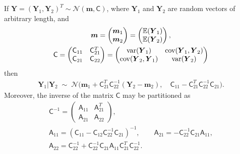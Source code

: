 \documentclass{svjour3}                     %
\newcommand{\bm}[1]{\boldsymbol{#1}}
\newcommand{\Ex}{\mathbb{E}}
\newcommand{\vm}{\bm{m}}
\newcommand{\vY}{\bm{Y}}
\newcommand{\mA}{\mathsf{A}}
\newcommand{\mC}{\mathsf{C}}
\newcommand{\cov}{{\textup{cov}}}
\newcommand{\var}{{\textup{var}}}
\newcommand{\calN}{\mathcal{N}}
\begin{document}
\begin{lemma} \cite[(A.6), (A.11--13)]{RasWil06a} \label{thrm:condDist} If $\vY = (\vY_1, \vY_2)^T \sim \calN (\vm,\mC)$, where $\vY_1$ and $\vY_2$ are random vectors of arbitrary length, and 
	\begin{gather*}
	\vm = \begin{pmatrix} \vm_1 \\ \vm_2 \end{pmatrix} = \begin{pmatrix} \Ex(\vY_1) \\ \Ex(\vY_2) \end{pmatrix}, \\
	\mC = \begin{pmatrix}
	\mC_{11} & \mC_{21}^T \\ 	\mC_{21} & \mC_{22}
	\end{pmatrix} =
	\begin{pmatrix}
	\var(\vY_{1}) & \cov(\vY_{1}, \vY_2) \\ 	\cov(\vY_2,\vY_{1}) & \var(\vY_{2})
	\end{pmatrix} 
	\end{gather*}
	then 
	\begin{align*}
	\vY_1 \vert \vY_2 \; \sim \; \calN \bigl(\vm_1 + \mC_{21}^T \mC_{22}^{-1}(\vY_2 - \vm_2), \quad \mC_{11} - \mC_{21}^T \mC_{22}^{-1} \mC_{21} \bigr).
	\end{align*}
	Moreover, the inverse of the matrix $\mC$ may be partitioned as
	\begin{gather*}
	\mC^{-1} = \begin{pmatrix} \mA_{11} & \mA_{21}^T \\ \mA_{21} & \mA_{22} \end{pmatrix}, \\
	\mA_{11} = (\mC_{11} - \mC_{12} \mC_{22}^{-1} \mC_{21})^{-1}, \qquad 
	\mA_{21} = -  \mC_{22}^{-1} \mC_{21} \mA_{11}, \\ 
	\mA_{22} = \mC_{22}^{-1} + \mC_{22}^{-1} \mC_{21} \mA_{11} \mC_{21}^T \mC_{22}^{-1}.
	\end{gather*}
\end{lemma}
\end{document}
